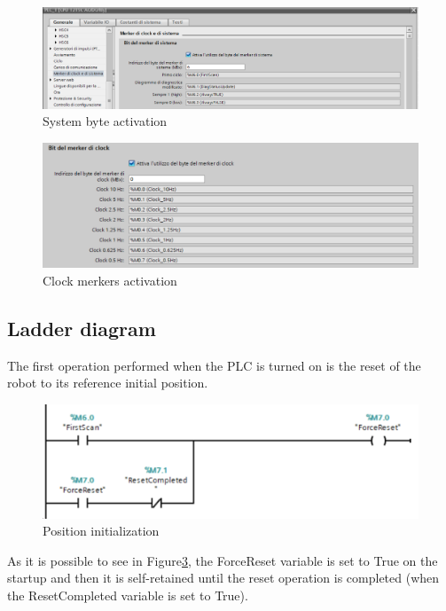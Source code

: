 \begin{figure}[!h]
\begin{center}
\includegraphics[width=0.6\linewidth]{capitolo3/figure/system_merker_byte_activation.PNG}
\caption{System byte activation }
\label{fig:merker}
\end{center}
\end{figure}

\begin{figure}[!h]
\begin{center}
\includegraphics[width=0.6\linewidth]{capitolo3/figure/Clock_merker_activation.PNG}
\caption{Clock merkers activation}
\label{fig:clock}
\end{center}
\end{figure}

\newpage
\subsection{Ladder diagram}
\label{sec:ladder}
The first operation performed when the PLC is turned on is the reset of the robot to its reference initial position.
\begin{figure}[!h]
\begin{center}
\includegraphics[width=0.6\linewidth]{capitolo3/figure/Reset.png}
\caption{Position initialization}
\label{fig:reset}
\end{center}
\end{figure}


As it is possible to see in Figure\ref{fig:reset}, the ForceReset variable is set to True on the startup and then it is self-retained until the reset operation is completed (when the ResetCompleted variable is set to True).

